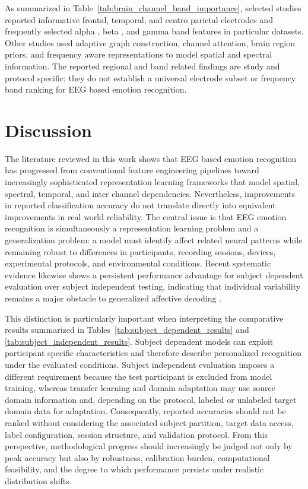 \documentclass[ASNA,twocolumn]{USG}
\begin{document}
As summarized in Table~\ref{tab:brain_channel_band_importance}, selected studies reported informative frontal, temporal, and centro parietal electrodes and frequently selected alpha , beta , and gamma band features in particular datasets. Other studies used adaptive graph construction, channel attention, brain region priors, and frequency aware representations to model spatial and spectral information. The reported regional and band related findings are study  and protocol specific; they do not establish a universal electrode subset or frequency band ranking for EEG based emotion recognition.

\section{Discussion}
\label{sec:discussion}

The literature reviewed in this work shows that EEG based emotion recognition has progressed from conventional feature engineering pipelines toward increasingly sophisticated representation learning frameworks that model spatial, spectral, temporal, and inter channel dependencies. Nevertheless, improvements in reported classification accuracy do not translate directly into equivalent improvements in real world reliability. The central issue is that EEG emotion recognition is simultaneously a representation learning problem and a generalization problem: a model must identify affect related neural patterns while remaining robust to differences in participants, recording sessions, devices, experimental protocols, and environmental conditions. Recent systematic evidence likewise shows a persistent performance advantage for subject dependent evaluation over subject independent testing, indicating that individual variability remains a major obstacle to generalized affective decoding \cite{prabowo2023systematic}.

This distinction is particularly important when interpreting the comparative results summarized in Tables~\ref{tab:subject_dependent_results} and \ref{tab:subject_independent_results}. Subject dependent models can exploit participant specific characteristics and therefore describe personalized recognition under the evaluated conditions. Subject independent evaluation imposes a different requirement because the test participant is excluded from model training, whereas transfer learning and domain adaptation may use source domain information and, depending on the protocol, labeled or unlabeled target domain data for adaptation. Consequently, reported accuracies should not be ranked without considering the associated subject partition, target data access, label configuration, session structure, and validation protocol. From this perspective, methodological progress should increasingly be judged not only by peak accuracy but also by robustness, calibration burden, computational feasibility, and the degree to which performance persists under realistic distribution shifts.
\end{document}
